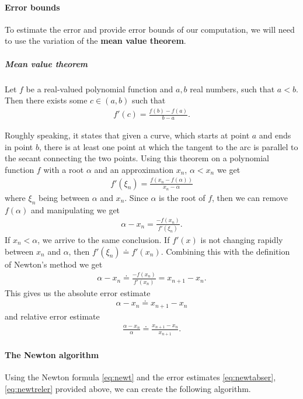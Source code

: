 \documentclass[
  digital, %
  table,   %
  nolof,     %
  nolot,     %
	draft, %
]{fithesis3}
\begin{document}
\paragraph{Error bounds}
To estimate the error and provide error bounds of our computation, we will need to use the variation of the \textbf{mean value theorem}.
\subparagraph{Mean value theorem}
\begin{theorem}
Let $f$ be a real-valued polynomial function and $a, b$ real numbers, such that $a < b$. Then there exists some $c\in(a, b)$ such that
\begin{align}
f'(c) = \frac{f(b) - f(a)}{b - a}.
\end{align}
\end{theorem}%
Roughly speaking, it states that given a curve, which starts at point $a$ and ends in point $b$, there is at least one point at which the tangent to the arc is parallel to the secant connecting the two points.
Using this theorem on a polynomial function $f$ with a root $\alpha$ and an approximation $x_{n}$, $\alpha < x_{n}$ we get 
\begin{align}
f'(\xi_n) = \frac{f(x_{n}-f(\alpha))}{x_{n}-\alpha}
\end{align}
where $\xi_{n}$ being between $\alpha$ and $x_{n}$. Since $\alpha$ is the root of $f$, then we can remove $f(\alpha)$ and manipulating we get
\begin{align}
\alpha - x_{n} = \frac{-f(x_{n})}{f'(\xi_n)}.
\end{align}
If $x_{n} < \alpha$, we arrive to the same conclusion. If $f'(x)$ is not changing rapidly between $x_{n}$ and $\alpha$, then $f'(\xi_{n}) \doteq f'(x_{n})$. Combining this with the definition of Newton's method we get
\begin{align}
\alpha - x_{n} \doteq \frac{-f(x_{n})}{f'(x_{n})} = x_{n+1} - x_{n}.
\end{align}
This gives us the absolute error estimate
\begin{align}
\alpha - x_{n} \doteq x_{n+1} - x_{n} \label{eq:newtabser}
\end{align}
and relative error estimate
\begin{align}
\frac{\alpha - x_{n}}{\alpha} \doteq \frac{x_{n+1} - x_{n}}{x_{n+1}}.\label{eq:newtreler}
\end{align}
\paragraph{The Newton algorithm}
Using the Newton formula \eqref{eq:newt} and the error estimates \eqref{eq:newtabser}, \eqref{eq:newtreler} provided above, we can create the following algorithm.
\end{document}

